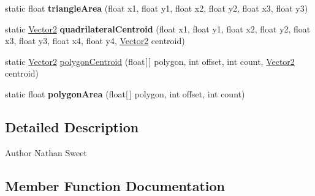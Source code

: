 \begin{DoxyCompactItemize}
\item 
\hypertarget{classairhockeyjava_1_1util_1_1_geometry_utils_acd698e6047b7790f370ae2059003c4f0}{}static float {\bfseries triangle\+Area} (float x1, float y1, float x2, float y2, float x3, float y3)\label{classairhockeyjava_1_1util_1_1_geometry_utils_acd698e6047b7790f370ae2059003c4f0}

\item 
\hypertarget{classairhockeyjava_1_1util_1_1_geometry_utils_a85200b1d92f311912d5b955f2468ae44}{}static \hyperlink{classairhockeyjava_1_1util_1_1_vector2}{Vector2} {\bfseries quadrilateral\+Centroid} (float x1, float y1, float x2, float y2, float x3, float y3, float x4, float y4, \hyperlink{classairhockeyjava_1_1util_1_1_vector2}{Vector2} centroid)\label{classairhockeyjava_1_1util_1_1_geometry_utils_a85200b1d92f311912d5b955f2468ae44}

\item 
static \hyperlink{classairhockeyjava_1_1util_1_1_vector2}{Vector2} \hyperlink{classairhockeyjava_1_1util_1_1_geometry_utils_a4dbe55d00442bf26096ac0eb57f74e3f}{polygon\+Centroid} (float\mbox{[}$\,$\mbox{]} polygon, int offset, int count, \hyperlink{classairhockeyjava_1_1util_1_1_vector2}{Vector2} centroid)
\item 
\hypertarget{classairhockeyjava_1_1util_1_1_geometry_utils_a004f9a0c0426970a594dba55a387ada3}{}static float {\bfseries polygon\+Area} (float\mbox{[}$\,$\mbox{]} polygon, int offset, int count)\label{classairhockeyjava_1_1util_1_1_geometry_utils_a004f9a0c0426970a594dba55a387ada3}

\end{DoxyCompactItemize}


\subsection{Detailed Description}
\begin{DoxyAuthor}{Author}
Nathan Sweet 
\end{DoxyAuthor}


\subsection{Member Function Documentation}
\hypertarget{classairhockeyjava_1_1util_1_1_geometry_utils_abce380f5fbde744d788d6daf5a734867}{}
